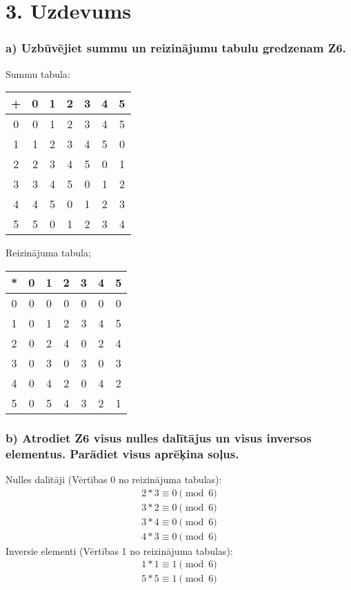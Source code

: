 \documentclass{article}
\begin{document}
\section*{3. Uzdevums}
\subsubsection*{a) Uzbūvējiet summu un reizinājumu tabulu gredzenam Z6.}

Summu tabula:
\begin{center}
    \begin{tabular}{ c | c c c c c c }
        + & 0 & 1 & 2 & 3 & 4 & 5 \\
        \hline
        0 & 0 & 1 & 2 & 3 & 4 & 5 \\
        1 & 1 & 2 & 3 & 4 & 5 & 0 \\
        2 & 2 & 3 & 4 & 5 & 0 & 1 \\
        3 & 3 & 4 & 5 & 0 & 1 & 2 \\
        4 & 4 & 5 & 0 & 1 & 2 & 3 \\
        5 & 5 & 0 & 1 & 2 & 3 & 4 \\
    \end{tabular}
\end{center}
Reizinājuma tabula;
\begin{center}
    \begin{tabular}{ c | c c c c c c }
        * & 0 & 1 & 2 & 3 & 4 & 5 \\
        \hline
        0 & 0 & 0 & 0 & 0 & 0 & 0 \\
        1 & 0 & 1 & 2 & 3 & 4 & 5 \\
        2 & 0 & 2 & 4 & 0 & 2 & 4 \\
        3 & 0 & 3 & 0 & 3 & 0 & 3 \\
        4 & 0 & 4 & 2 & 0 & 4 & 2 \\
        5 & 0 & 5 & 4 & 3 & 2 & 1 \\
    \end{tabular}
\end{center}

\subsubsection*{b) Atrodiet Z6 visus nulles dalītājus un visus inversos elementus. Parādiet visus aprēķina soļus.}

Nulles dalītāji (Vērtības 0 no reizinājuma tabulas):
\begin{gather*}
    2 * 3 \equiv 0 \pmod{6}\\
    3 * 2 \equiv 0 \pmod{6}\\
    3 * 4 \equiv 0 \pmod{6}\\
    4 * 3 \equiv 0 \pmod{6}
\end{gather*}
Inversie elementi (Vērtības 1 no reizinājuma tabulas):
\begin{gather*}
    1 * 1 \equiv 1 \pmod{6}\\
    5 * 5 \equiv 1 \pmod{6}
\end{gather*}
\end{document}
